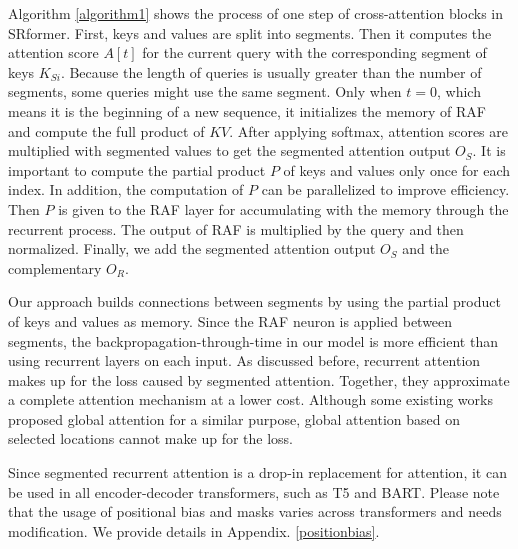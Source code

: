 \documentclass[11pt]{article}
\begin{document}
Algorithm \ref{algorithm1} shows the process of one step of cross-attention blocks in SRformer. First, keys and values are split into segments. Then it computes the attention score $A[t]$ for the current query with the corresponding segment of keys $K_{Si}$. Because the length of queries is usually greater than the number of segments, some queries might use the same segment. Only when $t=0$, which means it is the beginning of a new sequence, it initializes the memory of RAF and compute the full product of $KV$. After applying softmax, attention scores are multiplied with segmented values to get the segmented attention output $O_S$. It is important to compute the partial product $P$ of keys and values only once for each index. In addition, the computation of $P$ can be parallelized to improve efficiency.  Then $P$ is given to the RAF layer for accumulating with the memory through the recurrent process. The output of RAF is multiplied by the query and then normalized. Finally, we add the segmented attention output $O_S$ and the complementary $O_R$.

Our approach builds connections between segments by using the partial product of keys and values as memory. Since the RAF neuron is applied between segments, the backpropagation-through-time in our model is more efficient than using recurrent layers on each input. As discussed before, recurrent attention makes up for the loss caused by segmented attention. Together, they approximate a complete attention mechanism at a lower cost. Although some existing works proposed global attention for a similar purpose, global attention based on selected locations cannot make up for the loss. 


Since segmented recurrent attention is a drop-in replacement for attention, it can be used in all encoder-decoder transformers, such as T5 and BART. Please note that the usage of positional bias and masks varies across transformers and needs modification. We provide details in Appendix. \ref{positionbias}.
\end{document}
